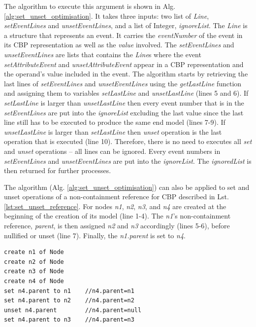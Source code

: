 \documentclass{llncs}
\begin{document}
The algorithm to execute this argument is shown in Alg. \ref{alg:set_unset_optimisation}. It takes three inputs: two list of \emph{Line}, \emph{setEventLines} and \emph{unsetEventLines}, and a list of Integer, \emph{ignoreList}. The \emph{Line} is a structure that represents an event. It carries the \emph{eventNumber} of the event in its CBP representation as well as the \emph{value} involved. The \emph{setEventLines} and \emph{unsetEventLines} are lists that contains the \emph{Line}s where the event \emph{setAttributeEvent} and \emph{unsetAttributeEvent} appear in a CBP representation and the operand's value included in the event. The algorithm starts by retrieving the last lines of \emph{setEventLines} and \emph{unsetEventLines} using the \emph{getLastLine} function and assigning them to variables \emph{setLastLine} and \emph{unsetLastLine} (lines 5 and 6). If \emph{setLastLine} is larger than \emph{unsetLastLine} then every event number that is in the \emph{setEventLines} are put into the \emph{ignoreList} excluding the last value since the last line still has to be executed to produce the same end model (lines 7-9). If \emph{unsetLastLine} is larger than \emph{setLastLine} then \emph{unset} operation is the last operation that is executed (line 10). Therefore, there is no need to executes all \emph{set} and \emph{unset} operations -- all lines can be ignored. Every event numbers in \emph{setEventLines} and \emph{unsetEventLines} are put into the \emph{ignoreList}. The \emph{ignoredList} is then returned for further processes.

The algorithm (Alg. \ref{alg:set_unset_optimisation}) can also be applied to set and unset operations of a non-containment reference for CBP described in Lst. \ref{lst:set_unset_reference}. For nodes \emph{n1}, \emph{n2}, \emph{n3}, and \emph{n4} are created at the beginning of the creation of its model (line 1-4). The \emph{n1}'s non-containment reference, \emph{parent}, is then assigned \emph{n2} and \emph{n3} accordingly (lines 5-6), before nullified or unset (line 7). Finally, the \emph{n1.parent} is set to \emph{n4}. 

\begin{lstlisting}[style=eol,caption={Example of CBP representation of \emph{name} reference assignments.},label=lst:set_unset_reference]
create n1 of Node
create n2 of Node
create n3 of Node
create n4 of Node
set n4.parent to n1    //n4.parent=n1
set n4.parent to n2    //n4.parent=n2
unset n4.parent        //n4.parent=null
set n4.parent to n3    //n4.parent=n3
\end{lstlisting}
\end{document}
